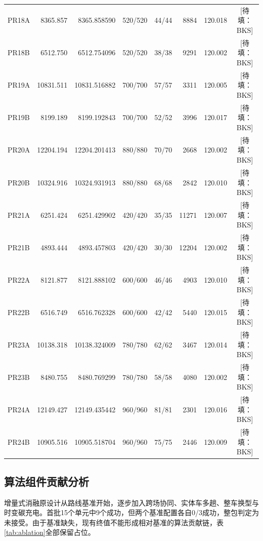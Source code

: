 \documentclass{setp-new}
\DeclareRobustCommand{\TBD}[1]{%
  \begingroup\setlength{\fboxsep}{1.2pt}%
  \colorbox{black!12}{\textcolor{black!65}{\textsf{\footnotesize[待填：#1]}}}%
  \endgroup}
\begin{document}
\begin{table}[htbp]
{\begin{tabular}{lrrrrrlc}
    PR18A & 8365.857 & 8365.858590 & 520/520 & 44/44 & 8884 & 120.018 & \TBD{BKS}\\
    PR18B & 6512.750 & 6512.754096 & 520/520 & 38/38 & 9291 & 120.002 & \TBD{BKS}\\
    PR19A & 10831.511 & 10831.516882 & 700/700 & 57/57 & 3311 & 120.005 & \TBD{BKS}\\
    PR19B & 8199.189 & 8199.192843 & 700/700 & 52/52 & 3996 & 120.017 & \TBD{BKS}\\
    PR20A & 12204.194 & 12204.201413 & 880/880 & 70/70 & 2668 & 120.002 & \TBD{BKS}\\
    PR20B & 10324.916 & 10324.931913 & 880/880 & 68/68 & 2842 & 120.010 & \TBD{BKS}\\
    PR21A & 6251.424 & 6251.429902 & 420/420 & 35/35 & 11271 & 120.007 & \TBD{BKS}\\
    PR21B & 4893.444 & 4893.457803 & 420/420 & 30/30 & 12204 & 120.002 & \TBD{BKS}\\
    PR22A & 8121.877 & 8121.888102 & 600/600 & 46/46 & 4903 & 120.010 & \TBD{BKS}\\
    PR22B & 6516.749 & 6516.762328 & 600/600 & 42/42 & 5440 & 120.015 & \TBD{BKS}\\
    PR23A & 10138.318 & 10138.324009 & 780/780 & 62/62 & 3467 & 120.014 & \TBD{BKS}\\
    PR23B & 8480.755 & 8480.769299 & 780/780 & 58/58 & 4080 & 120.002 & \TBD{BKS}\\
    PR24A & 12149.427 & 12149.435442 & 960/960 & 81/81 & 2301 & 120.016 & \TBD{BKS}\\
    PR24B & 10905.516 & 10905.518704 & 960/960 & 75/75 & 2446 & 120.009 & \TBD{BKS}\\
    \bottomrule
  \end{tabular}
  }
\end{table}

\subsection{算法组件贡献分析}

增量式消融原设计从路线基准开始，逐步加入跨场协同、实体车多趟、整车换型与时变碳充电。首批15个单元中9个成功，但两个基准配置各自0/3成功，整包判定为未接受。由于基准缺失，现有终值不能形成相对基准的算法贡献链，表\ref{tab:ablation}全部保留占位。
\end{document}
